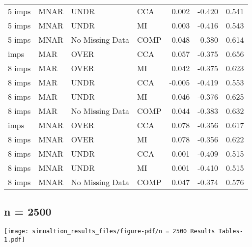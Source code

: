 \documentclass[
  letterpaper,
  DIV=11,
  numbers=noendperiod]{scrartcl}
\begin{document}
\begin{tabular}[t]{llllrrr}
5 imps & MNAR & UNDR & CCA & 0.002 & -0.420 & 0.541\\
5 imps & MNAR & UNDR & MI & 0.003 & -0.416 & 0.543\\
5 imps & MNAR & No Missing Data & COMP & 0.048 & -0.380 & 0.614\\
\addlinespace
8 imps & MAR & OVER & CCA & 0.057 & -0.375 & 0.656\\
8 imps & MAR & OVER & MI & 0.042 & -0.375 & 0.623\\
8 imps & MAR & UNDR & CCA & -0.005 & -0.419 & 0.553\\
8 imps & MAR & UNDR & MI & 0.046 & -0.376 & 0.625\\
8 imps & MAR & No Missing Data & COMP & 0.044 & -0.383 & 0.632\\
\addlinespace
8 imps & MNAR & OVER & CCA & 0.078 & -0.356 & 0.617\\
8 imps & MNAR & OVER & MI & 0.078 & -0.356 & 0.622\\
8 imps & MNAR & UNDR & CCA & 0.001 & -0.409 & 0.515\\
8 imps & MNAR & UNDR & MI & 0.001 & -0.410 & 0.515\\
8 imps & MNAR & No Missing Data & COMP & 0.047 & -0.374 & 0.576\\
\bottomrule
\end{tabular}

\hypertarget{n-2500}{%
\subsection{n = 2500}\label{n-2500}}

\texttt{[image: simualtion\_results\_files/figure-pdf/n = 2500 Results Tables-1.pdf]}
\end{document}

